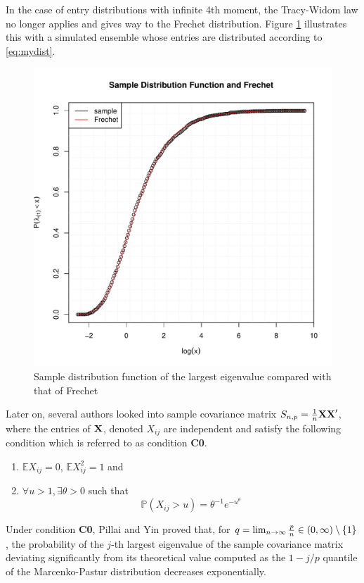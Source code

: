 \documentclass[11pt,reqno]{amsart}
\newcommand{\E}{\mathbb{E}}
\renewcommand{\P}{\mathbb{P}}
\newcommand{\1}{\mathds{1}}
\newcommand{\0}{\boldsymbol{0}}
\newcommand{\4}{\mathchoice{\mskip1.5mu}{\mskip1.5mu}{}{}}
\newcommand{\5}{\mathchoice{\mskip-1.5mu}{\mskip-1.5mu}{}{}}
\newcommand{\2}{\penalty250\mskip\thickmuskip\mskip-\thinmuskip} %
\begin{document}
In the case of entry distributions with infinite 4th moment, the
Tracy-Widom law no longer applies and gives way to the Frechet
distribution. Figure \ref{fig:MyDist-Frechet} illustrates this with a
simulated ensemble whose entries are distributed according to
\eqref{eq:mydist}.
\begin{figure}[htb!]
  \centering
  \includegraphics[scale=0.5]{MyDist-Frechet.pdf}  
  \caption{Sample distribution function of the largest eigenvalue compared with that of Frechet}
  \label{fig:MyDist-Frechet}
\end{figure}
Later on, several authors \cite{Pillai:Yin:2011, tao:vu:2012,
  Wang:2012} looked into sample covariance matrix $S_{n, p} = {1
  \over n} \bf{XX}'$, where the entries of $\bf X$, denoted $X_{ij}$
are independent and satisfy the following condition which is referred
to as condition {\bf C0}.
\begin{enumerate}
\item $\E X_{ij} = 0$, $\E X_{ij}^2 = 1$ and
\item $\forall u > 1, \exists \theta > 0$ such that
  \[
  \P(X_{ij} > u) = \theta^{-1} e^{-u^{\theta}}
  \]
\end{enumerate}
Under condition {\bf C0}, Pillai and Yin \cite{Pillai:Yin:2011} proved
that, for $q = \lim_{n \to \infty} {p \over n} \in (0, \infty)
\setminus \{1\}$, the probability of the $j$-th largest eigenvalue of
the sample covariance matrix deviating significantly from its
theoretical value computed as the $1 - j/p$ quantile of the
Marcenko-Pastur distribution decreases exponentially\footnotemark.
\end{document}
